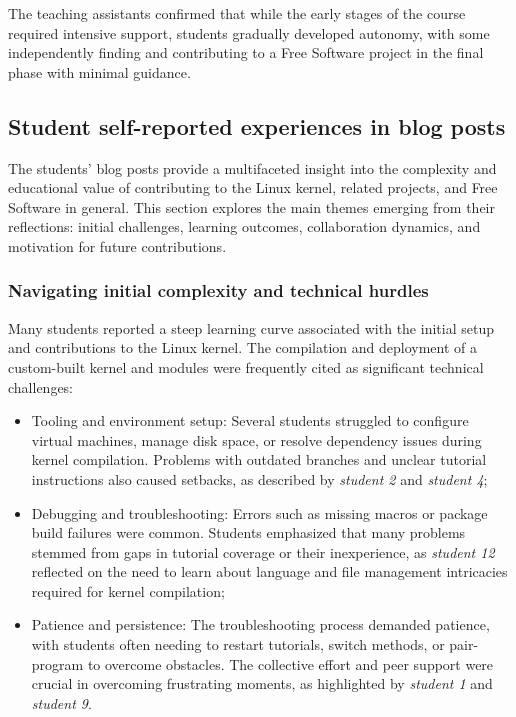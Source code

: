 The teaching assistants confirmed that while the early stages of the course
required intensive support, students gradually developed autonomy, with some
independently finding and contributing to a Free Software project in the final
phase with minimal guidance.

\subsection{Student self-reported experiences in blog posts}
\label{sec:results:blog-posts}

The students' blog posts provide a multifaceted insight into the complexity and
educational value of contributing to the Linux kernel, related projects, and
Free Software in general. This section explores the main themes emerging from
their reflections: initial challenges, learning outcomes, collaboration
dynamics, and motivation for future contributions.

\subsubsection{Navigating initial complexity and technical hurdles}

Many students reported a steep learning curve associated with the initial setup
and contributions to the Linux kernel. The compilation and deployment of a
custom-built kernel and modules were frequently cited as significant technical
challenges:

\begin{itemize}
    \item Tooling and environment setup: Several students struggled to configure
    virtual machines, manage disk space, or resolve dependency issues during
    kernel compilation. Problems with outdated branches and unclear tutorial
    instructions also caused setbacks, as described by \textit{student 2} and
    \textit{student 4};
    \item Debugging and troubleshooting: Errors such as missing macros or
    package build failures were common. Students emphasized that many problems
    stemmed from gaps in tutorial coverage or their inexperience, as
    \textit{student 12} reflected on the need to learn about language and file
    management intricacies required for kernel compilation;
    \item Patience and persistence: The troubleshooting process demanded
    patience, with students often needing to restart tutorials, switch methods,
    or pair-program to overcome obstacles. The collective effort and peer
    support were crucial in overcoming frustrating moments, as highlighted by
    \textit{student 1} and \textit{student 9}.
\end{itemize}

